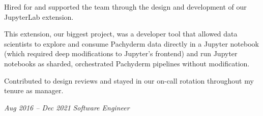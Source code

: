 \documentclass[10pt, letterpaper]{article}
\begin{document}
\begin{comment}
\begin{onecolentry}
  \small
  \textbf{Pachyderm is a distributed filesystem with versioning, designed to eliminate duplicate work in e.g. ETL and ML preprocessing pipelines and, eventually, AI training. We were ``Git for data'' or ``Bazel for data''.}
\end{onecolentry}

\vspace{0.1 cm}

\begin{twocolentry}{
    \textit{Jan 2022 – Feb 2023}
}
    \textit{Software Engineering Manager}
\end{twocolentry}

\vspace{0.1 cm}

\end{comment}

\begin{onecolentry}
    \begin{highlights}
        \item Hired for and supported the team through the design and development of our JupyterLab extension.
        \item This extension, our biggest project, was a developer tool that allowed data scientists to explore and consume Pachyderm data directly in a Jupyter notebook (which required deep modifications to Jupyter's frontend) and run Jupyter notebooks as sharded, orchestrated Pachyderm pipelines without modification.
        \item Contributed to design reviews and stayed in our on-call rotation throughout my tenure as manager.
    \end{highlights}
\end{onecolentry}

\vspace{0.2 cm}

\begin{twocolentry}{
    \textit{Aug 2016 – Dec 2021}
}
    \textit{Software Engineer}
\end{twocolentry}
\end{document}
